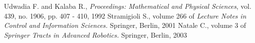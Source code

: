 \documentclass[conference]{IEEEtran}
\begin{document}
%


\begin{thebibliography}{1}

Udwadia F. and Kalaba R.,
\newblock  \textit{Proceedings: Mathematical and Physical Sciences}, vol. 439, no. 1906, pp. 407 - 410, 1992
Stramigioli S.,
\newblock volume 266 of \textit{Lecture Notes in Control and Information Sciences.}
\newblock Springer, Berlin, 2001
Natale C.,
\newblock volume 3 of \textit{Springer Tracts in Advanced Robotics.}
\newblock Springer, Berlin, 2003



\end{thebibliography}




\end{document}
